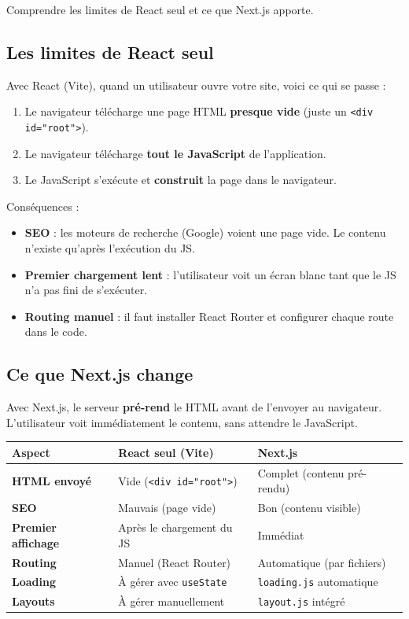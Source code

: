 \documentclass[11pt,a4paper]{article}
\begin{document}
\begin{objectifbox}
Comprendre les limites de React seul et ce que Next.js apporte.
\end{objectifbox}

\subsection{Les limites de React seul}

Avec React (Vite), quand un utilisateur ouvre votre site, voici ce qui se passe :

\begin{enumerate}[nosep]
\item Le navigateur télécharge une page HTML \textbf{presque vide} (juste un \texttt{<div id="root">}).
\item Le navigateur télécharge \textbf{tout le JavaScript} de l'application.
\item Le JavaScript s'exécute et \textbf{construit} la page dans le navigateur.
\end{enumerate}

Conséquences :
\begin{itemize}[nosep]
\item \textbf{SEO} : les moteurs de recherche (Google) voient une page vide. Le contenu n'existe qu'après l'exécution du JS.
\item \textbf{Premier chargement lent} : l'utilisateur voit un écran blanc tant que le JS n'a pas fini de s'exécuter.
\item \textbf{Routing manuel} : il faut installer React Router et configurer chaque route dans le code.
\end{itemize}

\subsection{Ce que Next.js change}

Avec Next.js, le serveur \textbf{pré-rend} le HTML avant de l'envoyer au navigateur. L'utilisateur voit immédiatement le contenu, sans attendre le JavaScript.

\begin{center}
\begin{tabular}{lp{4cm}p{4.5cm}}
\toprule
\textbf{Aspect} & \textbf{React seul (Vite)} & \textbf{Next.js} \\
\midrule
\textbf{HTML envoyé} & Vide (\texttt{<div id="root">}) & Complet (contenu pré-rendu) \\
\textbf{SEO} & Mauvais (page vide) & Bon (contenu visible) \\
\textbf{Premier affichage} & Après le chargement du JS & Immédiat \\
\textbf{Routing} & Manuel (React Router) & Automatique (par fichiers) \\
\textbf{Loading} & À gérer avec \texttt{useState} & \texttt{loading.js} automatique \\
\textbf{Layouts} & À gérer manuellement & \texttt{layout.js} intégré \\
\bottomrule
\end{tabular}
\end{center}
\end{document}
